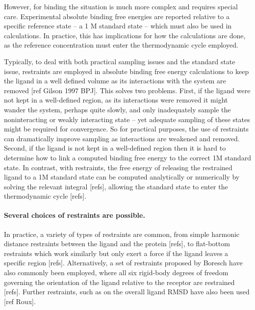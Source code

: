 \documentclass[9pt,bestpractices]{livecoms}
\begin{document}
However, for binding the situation is much more complex and requires special care.
Experimental absolute binding free energies are reported relative to a specific reference state -- a 1 M standard state -- which must also be used in calculations.
In practice, this has implications for how the calculations are done, as the reference concentration must enter the thermodynamic cycle employed.


Typically, to deal with both practical sampling issues and the standard state issue, restraints are employed in absolute binding free energy calculations to keep the ligand in a well defined volume as its interactions with the system are removed [ref Gilson 1997 BPJ].
This solves two problems.
First, if the ligand were not kept in a well-defined region, as its interactions were removed it might wander the system, perhaps quite slowly, and only inadequately sample the noninteracting or weakly interacting state -- yet adequate sampling of these states might be required for convergence.
So for practical purposes, the use of restraints can dramatically improve sampling as interactions are weakened and removed.
Second, if the ligand is not kept in a well-defined region then it is hard to determine how to link a computed binding free energy to the correct 1M standard state.
In contrast, with restraints, the free energy of releasing the restrained ligand to a 1M standard state can be computed analytically or numerically by solving the relevant integral [refs], allowing the standard state to enter the thermodynamic cycle [refs].

\paragraph{Several choices of restraints are possible.}
In practice, a variety of types of restraints are common, from simple harmonic distance restraints between the ligand and the protein [refs], to flat-bottom restraints which work similarly but only exert a force if the ligand leaves a specific region [refs].
Alternatively, a set of restraints proposed by Boresch have also commonly been employed, where all six rigid-body degrees of freedom governing the orientation of the ligand relative to the receptor are restrained [refs].
Further restraints, such as on the overall ligand RMSD have also been used [ref Roux].
\end{document}
